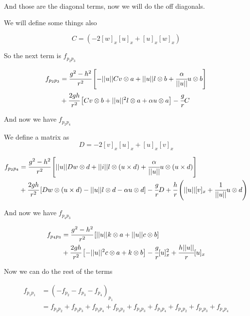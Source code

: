 \documentclass[11pt]{article}
\theoremstyle{plain}
\theoremstyle{definition}
\begin{document}
And those are the diagonal terms, now we will do the off diagonals.

We will define some things also 

\begin{equation}
    C = (-2[w]_x[u]_x + [u]_x[w]_x)
\end{equation}

So the next term is $f_{p_2p_3}$

\begin{align}
    f_{p_2 p_3}&= \cfrac{g^2-h^2}{r^2}\left[  -||u||Cv \otimes a + ||u|| l \otimes b  + \cfrac{\alpha }{||u||} u \otimes b  \right]\\
    & +\cfrac{2gh }{r^2}\left[Cv \otimes b + ||u||^2 l\otimes a + \alpha u \otimes a \right] - \cfrac{g}{r}C
\end{align}


And now we have $f_{p_2p_4}$

We define a matrix as  
\begin{equation}
    D = -2[v]_x[u]_x + [u]_x[v]_x
\end{equation}

\begin{align}
    f_{p_2 p_4} &= \cfrac{g^2-h^2}{r^2}\left[||u|| Dw \otimes d + ||i|| l \otimes (u\times d) + \cfrac{\alpha}{||u||}u \otimes (u\times d ) \right]\\
    & +\cfrac{2gh}{r^2}\left[ D w \otimes (u\times d) - ||u||l \otimes d  - \alpha u \otimes d \right] - \cfrac{g}{r}D + \cfrac{h}{r}\left( ||u||[v]_x + \cfrac{1}{||u||} u \otimes d \right)
\end{align}


And now we have $f_{p_4p_3}$

\begin{align}
    f_{p_4p_3}&= \cfrac{g^2-h^2}{r^2}\left[ ||u|| k \otimes a + ||u|| c \otimes b   \right]\\
    &+ \cfrac{2gh}{r^2}\left[  -||u||^2 c\otimes a + k \otimes b  \right] - \cfrac{g}{r}[u]_x^2 +\cfrac{h||u||}{r} [u]_x
\end{align}


Now we can do the rest of the terms 

\begin{align}
    f_{p_1p_1 } &= (-f_{p_2} -f_{p_3} -f_{p_4})_p_1\\
                &= f_{p_2p_2} + f_{p_2p_3} + f_{p_2p_4} + f_{p_3p_2} +f_{p_3p_3} + f_{p_3p_4} + f_{p_4p_2} + f_{p_4p_3} + f_{p_4p_4}
\end{align}
\end{document}
